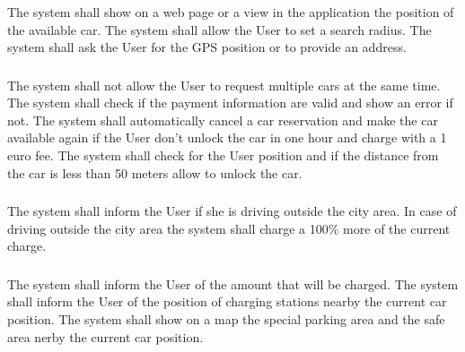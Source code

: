 \subsubsection{}
\begin{itemize}
	\reqcounter The system shall show on a web page or a view in the application the position of the available car.
	\reqcounter The system shall allow the User to set a search radius.
	\reqcounter The system shall ask the User for the GPS position or to provide an address.
\end{itemize}


\subsubsection{}
\begin{itemize}
	\reqcounter The system shall not allow the User to request multiple cars at the same time.
	\reqcounter The system shall check if the payment information are valid and show an error if not.
	\reqcounter The system shall automatically cancel a car reservation and make the car available again if the User don't unlock the car in one hour and charge with a 1 euro fee.
	\reqcounter The system shall check for the User position and if the distance from the car is less than 50 meters
	allow to unlock the car.
\end{itemize}

\subsubsection{}
\begin{itemize}
	\reqcounter The system shall inform the User if she is driving outside the city area.
	\reqcounter In case of driving outside the city area the system shall charge a 100\%  more of the current charge.
\end{itemize}



\subsubsection{}

\begin{itemize}
	\reqcounter The system shall inform the User of the amount that will be charged.
	\reqcounter The system shall inform the User of the position of charging stations nearby the current car position.
	\reqcounter The system shall show on a map the special parking area and the safe area nerby the current car position.
\end{itemize}


